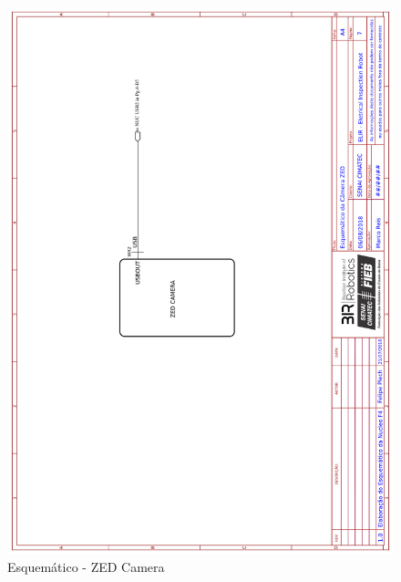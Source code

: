     \begin{figure}[H]
	\centering
	\includegraphics[width=14cm]{Figures/EsquematicoZED.png}
	\caption{Esquemático - ZED Camera} \label{ZED}
	\end{figure}
	
	\pagebreak
	
